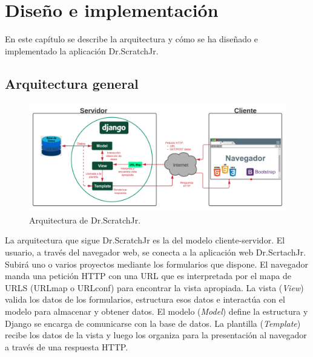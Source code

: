 \documentclass[a4paper, 12pt]{book}
\begin{document}

\cleardoublepage
\chapter{Diseño e implementación}
\label{chap:implementacion}

En este capítulo se describe la arquitectura y cómo se ha diseñado e implementado la aplicación Dr.ScratchJr.

\section{Arquitectura general} 
\label{sec:arquitectura}

\begin{figure}[h!]
  \centering
  \includegraphics[width=16cm, keepaspectratio]{img/arquitectura.png}
  \caption{Arquitectura de Dr.ScratchJr.}\label{fig:arquitectura}
\end{figure}

La arquitectura que sigue Dr.ScratchJr es la del modelo cliente-servidor.
El usuario, a través del navegador web, se conecta a la aplicación web Dr.ScrtachJr.
Subirá uno o varios proyectos mediante los formularios que dispone. 
El navegador manda una petición HTTP con una URL que es interpretada por el mapa de URLS (URLmap o URLconf) para encontrar la vista apropiada.
La vista (\emph{View}) valida los datos de los formularios, estructura esos datos e interactúa con el modelo para almacenar y obtener datos.
El modelo (\emph{Model}) define la estructura y Django se encarga de comunicarse con la base de datos.
La plantilla (\emph{Template}) recibe los datos de la vista y luego los organiza para la presentación al navegador a través de una respuesta HTTP.
\end{document}
